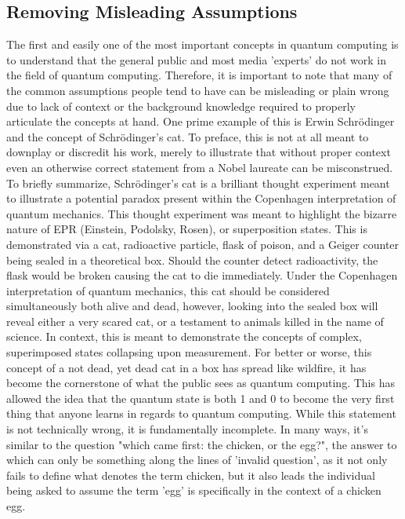 \documentclass[a4paper]{article}
\begin{document}
\subsection{Removing Misleading Assumptions}
The first and easily one of the most important concepts in quantum computing is to understand that the general public and most media 'experts' do not work in the field of quantum computing.  Therefore, it is important to note that many of the common assumptions people tend to have can be misleading or plain wrong due to lack of context or the background knowledge required to properly articulate the concepts at hand.\newline
\newline
One prime example of this is Erwin Schrödinger and the concept of Schrödinger's cat.  To preface, this is not at all meant to downplay or discredit his work, merely to illustrate that without proper context even an otherwise correct statement from a Nobel laureate can be misconstrued.  \newline
\newline %
To briefly summarize, Schrödinger's cat is a brilliant thought experiment meant to illustrate a potential paradox present within the Copenhagen interpretation of quantum mechanics.  This thought experiment was meant to highlight the bizarre nature of EPR (Einstein, Podolsky, Rosen), or superposition states.  This is demonstrated via a cat, radioactive particle, flask of poison, and a Geiger counter being sealed in a theoretical box.  Should the counter detect radioactivity, the flask would be broken causing the cat to die immediately.  Under the Copenhagen interpretation of quantum mechanics, this cat should be considered simultaneously both alive and dead, however, looking into the sealed box will reveal either a very scared cat, or a testament to animals killed in the name of science. \newline
\newline
In context, this is meant to demonstrate the concepts of complex, superimposed states collapsing upon measurement. For better or worse, this concept of a not dead, yet dead cat in a box has spread like wildfire, it has become the cornerstone of what the public sees as quantum computing. This has allowed the idea that the quantum state is both 1 and 0 to become the very first thing that anyone learns in regards to quantum computing.  While this statement is not technically wrong, it is fundamentally incomplete. In many ways, it's similar to the question "which came first: the chicken, or the egg?", the answer to which can only be something along the lines of 'invalid question', as it not only fails to define what denotes the term chicken, but it also leads the individual being asked to assume the term 'egg' is specifically in the context of a chicken egg. \newline
\end{document}
